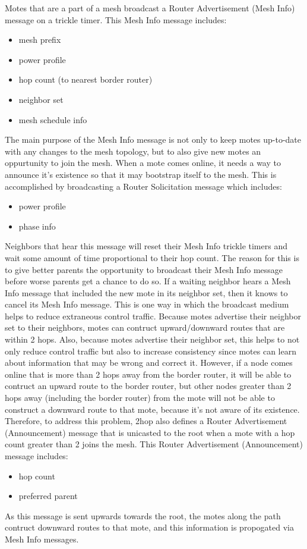Motes that are a part of a mesh broadcast a Router Advertisement (Mesh Info) message on a trickle timer. 
This Mesh Info message includes:
\begin{itemize}
\item mesh prefix
\item power profile
\item hop count (to nearest border router)
\item neighbor set
\item mesh schedule info
\end{itemize}
The main purpose of the Mesh Info message is not only to keep motes up-to-date with any changes to the mesh topology, but to also give new motes an oppurtunity to join the mesh.
When a mote comes online, it needs a way to announce it's existence so that it may bootstrap itself to the mesh. 
This is accomplished by broadcasting a Router Solicitation message which includes: 
\begin{itemize}
\item power profile
\item phase info
\end{itemize}
Neighbors that hear this message will reset their Mesh Info trickle timers and wait some amount of time proportional to their hop count. 
The reason for this is to give better parents the opportunity to broadcast their Mesh Info message before worse parents get a chance to do so.
If a waiting neighbor hears a Mesh Info message that included the new mote in its neighbor set, then it knows to cancel its Mesh Info message.
This is one way in which the broadcast medium helps to reduce extraneous control traffic.
Because motes advertise their neighbor set to their neighbors, motes can contruct upward/downward routes that are within 2 hops.
Also, because motes advertise their neighbor set, this helps to not only reduce control traffic but also to increase consistency since motes can learn about information that may be wrong and correct it.
However, if a node comes online that is more than 2 hops away from the border router, it will be able to contruct an upward route to the border router, but other nodes greater than 2 hops away (including the border router) from the mote will not be able to construct a downward route to that mote, because it's not aware of its existence.
Therefore, to address this problem, 2hop also defines a Router Advertisement (Announcement) message that is unicasted to the root when a mote with a hop count greater than 2 joins the mesh.
This Router Advertisement (Announcement) message includes:
\begin{itemize}
\item hop count
\item preferred parent
\end{itemize}
As this message is sent upwards towards the root, the motes along the path contruct downward routes to that mote, and this information is propogated via Mesh Info messages.


